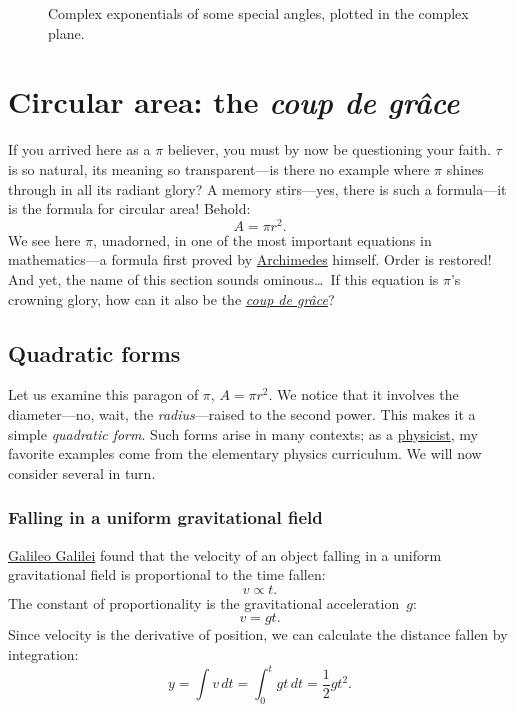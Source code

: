 \begin{figure}
\begin{center}
\end{center}
\caption{Complex exponentials of some special angles, plotted in the complex plane.\label{fig:tau_euler_circle}}
\end{figure}


\section{Circular area: the \emph{coup de gr\^{a}ce}} %
\label{sec:circular_area}

If you arrived here as a $\pi$ believer, you must by now be questioning your faith. $\tau$ is so natural, its meaning so transparent---is there no example where $\pi$ shines through in all its radiant glory? A memory stirs---yes, there is such a formula---it is the formula for circular area! Behold:
\[ A = \pi r^2. \]
We see here $\pi$, unadorned, in one of the most important equations in mathematics---a formula first proved by \href{http://en.wikipedia.org/wiki/Archimedes}{Archimedes} himself. Order is restored! And yet, the name of this section sounds ominous\ldots\ If this equation is $\pi$'s crowning glory, how can it also be the \href{http://en.wikipedia.org/wiki/Coup_de_grace}{\emph{coup de gr\^{a}ce}}?


  \subsection{Quadratic forms} %
  \label{sec:quadratic_forms}

Let us examine this paragon of $\pi$, $A = \pi r^2$. We notice that it involves the diameter---no, wait, the \emph{radius}---raised to the second power. This makes it a simple \emph{quadratic form}. Such forms arise in many contexts; as a \href{http://thesis.library.caltech.edu/1940/}{physicist}, my favorite examples come from the elementary physics curriculum. We will now consider several in turn.

    \subsubsection{Falling in a uniform gravitational field} %
    \label{sec:falling_in_a_uniform_gravitational_field}

\href{http://en.wikipedia.org/wiki/Galileo_Galilei}{Galileo Galilei} found that the velocity of an object falling in a uniform gravitational field is proportional to the time fallen:
\[ v \propto t. \]
The constant of proportionality is the gravitational acceleration~$g$:
\[ v = g t. \]
Since velocity is the derivative of position, we can calculate the distance fallen by integration:
\[ y = \int v\,dt = \int_0^t gt\,dt = \textstyle{\frac{1}{2}} gt^2. \]


